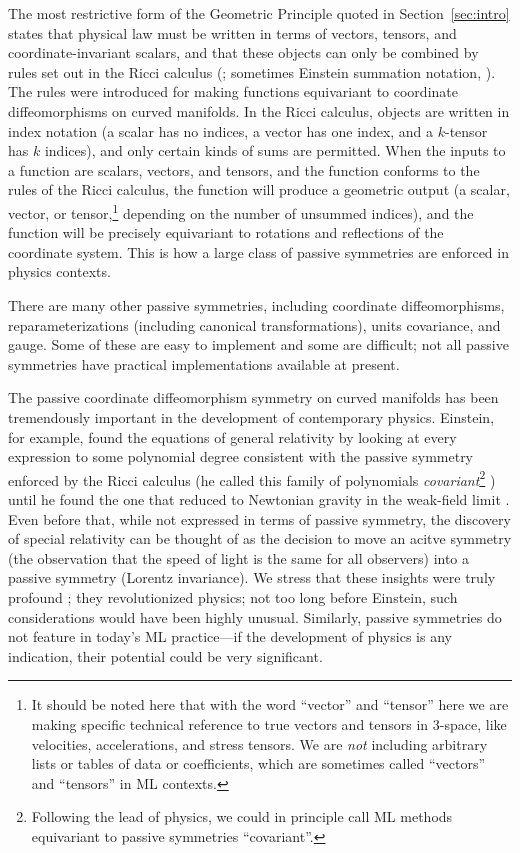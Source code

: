 \documentclass{article}
\theoremstyle{plain}
\theoremstyle{definition}
\theoremstyle{remark}
\newcommand{\sectionname}{Section}
\newcommand{\secref}[1]{\sectionname~\ref{#1}}
\begin{document}
The most restrictive form of the Geometric Principle quoted in \secref{sec:intro} states that physical law must be written in terms of vectors, tensors, and coordinate-invariant scalars, and that these objects can only be combined by rules set out in the Ricci calculus (\citealt{ricci}; sometimes Einstein summation notation, \citealt{einstein}).
The rules were introduced for making functions equivariant to coordinate diffeomorphisms on curved manifolds.
In the Ricci calculus, objects are written in index notation (a scalar has no indices, a vector has one index, and a $k$-tensor has $k$ indices), and only certain kinds of sums are permitted.
When the inputs to a function are scalars, vectors, and tensors, and the function conforms to the rules of the Ricci calculus, the function will produce a geometric output (a scalar, vector, or tensor,\footnote{It should be noted here that with the word ``vector'' and ``tensor'' here we are making specific technical reference to true vectors and tensors in 3-space, like velocities, accelerations, and stress tensors. We are \emph{not} including arbitrary lists or tables of data or coefficients, which are sometimes called ``vectors'' and ``tensors'' in ML contexts.} depending on the number of unsummed indices), and the function will be precisely equivariant to rotations and reflections of the coordinate system.
This is how a large class of passive symmetries are enforced in physics contexts.

There are many other passive symmetries, including coordinate diffeomorphisms, reparameterizations (including canonical transformations), units covariance, and gauge.
Some of these are easy to implement and some are difficult;
not all passive symmetries have practical implementations available at present.

The passive coordinate diffeomorphism symmetry on curved manifolds has been tremendously important in the development of contemporary physics.
Einstein, for example, found the equations of general relativity by looking at every expression to some polynomial degree consistent with the passive symmetry enforced by the Ricci calculus (he called this family of polynomials \emph{covariant}\footnote{Following the lead of physics, we could in principle call ML methods equivariant to passive symmetries ``covariant''.}
) until he found the one that reduced to Newtonian gravity in the weak-field limit \cite{gr}. Even before that, while not expressed in terms of passive symmetry, the discovery of special relativity \cite{sr} can be thought of as the decision to move an acitve symmetry (the observation that the speed of light is the same for all observers) into a passive symmetry (Lorentz invariance). We stress that these insights were truly profound \cite{EARMAN1978251}; they revolutionized physics; not too long before Einstein, such considerations would have been highly unusual. 
Similarly, passive symmetries do not feature in today's ML practice---if the development of physics is any indication, their potential could be very significant.
\end{document}
